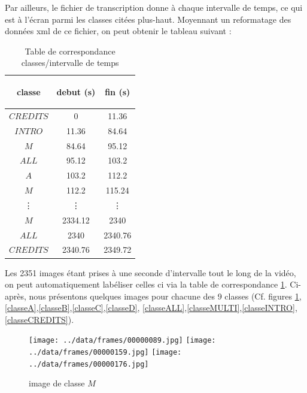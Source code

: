 \documentclass{book}
\begin{document}
Par ailleurs, le fichier de transcription donne à chaque intervalle de temps, ce qui est à l'écran parmi les classes citées plus-haut. 
Moyennant un reformatage des données xml de ce fichier, on peut obtenir le tableau suivant :

\begin{table}[H]
\begin{center}
\begin{tabular}{|c|c|c|}
\hline
\begin{bf}classe\end{bf} & \begin{bf}debut (s)\end{bf} & \begin{bf}fin (s)\end{bf} \\
\hline
$CREDITS$	& 0 & 11.36 \\
\hline
$INTRO$   & 11.36	& 84.64 \\
\hline
$M$	& 84.64	& 95.12 \\
\hline
$ALL$	& 95.12	& 103.2 \\
\hline
$A$	& 103.2	& 112.2 \\
\hline
$M$	& 112.2	& 115.24 \\
\hline
\vdots & \vdots &\vdots \\
\hline
$M$	& 2334.12 & 2340 \\
\hline
$ALL$	& 2340 & 2340.76 \\
\hline
$CREDITS$	& 2340.76 & 2349.72 \\
\hline
\end{tabular}
\end{center}
\caption{Table de correspondance classes/intervalle de temps}
\label{Table correspondance classe/temps}
\end{table}
\clearpage

Les 2351 images étant prises à une seconde d'intervalle tout le long de la vidéo, on peut automatiquement labéliser celles ci via la table de
correspondance \ref{Table correspondance classe/temps}.
Ci-après, nous présentons quelques images pour chacune des 9 classes (Cf. figures \ref{classeM},\ref{classeA},\ref{classeB},\ref{classeC},\ref{classeD},
\ref{classeALL},\ref{classeMULTI},\ref{classeINTRO},\ref{classeCREDITS}).
\begin{figure}[H]
\begin{center}
\texttt{[image: ../data/frames/00000089.jpg]}
\texttt{[image: ../data/frames/00000159.jpg]}
\texttt{[image: ../data/frames/00000176.jpg]}
\end{center}
\caption{image de classe $M$}
\label{classeM}
\end{figure}
\end{document}
